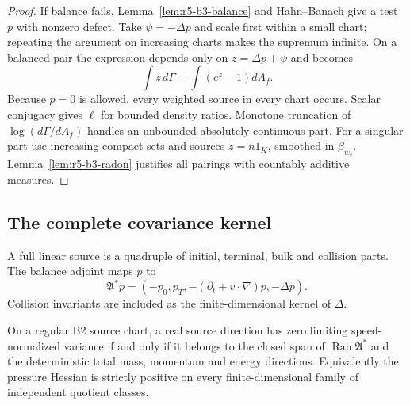 \begin{proof}
If balance fails, Lemma~\ref{lem:r5-b3-balance} and Hahn--Banach give a test
\(p\) with nonzero defect.  Take \(\psi=-\Delta p\) and scale first within a
small chart; repeating the argument on increasing charts makes the supremum
infinite.  On a balanced pair the expression depends only on
\(z=\Delta p+\psi\) and becomes
\[
 \int z\,d\Gamma-\int(e^z-1)dA_f.
\]
Because \(p=0\) is allowed, every weighted source in every chart occurs.
Scalar conjugacy gives \(\ell\) for bounded density ratios.  Monotone
truncation of \(\log(d\Gamma/dA_f)\) handles an unbounded absolutely continuous
part.  For a singular part use increasing compact sets and sources
\(z=n1_K\), smoothed in \(\beta_{w_c}\).  Lemma~\ref{lem:r5-b3-radon}
justifies all pairings with countably additive measures.
\end{proof}

\subsection{The complete covariance kernel}

A full linear source is a quadruple of initial, terminal, bulk and collision
parts.  The balance adjoint maps \(p\) to
\[
 \mathfrak A^*p=(-p_0,p_T,-(\partial_t+v\cdot\nabla)p,-\Delta p).
\]
Collision invariants are included as the finite-dimensional kernel of
\(\Delta\).

\begin{theorem}
\label{thm:r5-b3-kernel}
On a regular B2 source chart, a real source direction has zero limiting
speed-normalized variance if and only if it belongs to the closed span of
\(\operatorname{Ran}\mathfrak A^*\) and the deterministic total mass,
momentum and energy directions.  Equivalently the pressure Hessian is strictly
positive on every finite-dimensional family of independent quotient classes.
\end{theorem}

